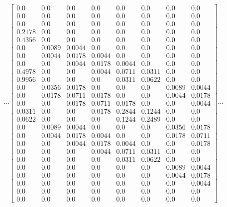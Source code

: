 \documentclass[12pt]{article}
\begin{document}
\[ \cdots \left[\begin{matrix}0.0 & 0.0 & 0.0 & 0.0 & 0.0 & 0.0 & 0.0 & 0.0\\0.0 & 0.0 & 0.0 & 0.0 & 0.0 & 0.0 & 0.0 & 0.0\\0.0 & 0.0 & 0.0 & 0.0 & 0.0 & 0.0 & 0.0 & 0.0\\0.2178 & 0.0 & 0.0 & 0.0 & 0.0 & 0.0 & 0.0 & 0.0\\0.4356 & 0.0 & 0.0 & 0.0 & 0.0 & 0.0 & 0.0 & 0.0\\0.0 & 0.0089 & 0.0044 & 0.0 & 0.0 & 0.0 & 0.0 & 0.0\\0.0 & 0.0044 & 0.0178 & 0.0044 & 0.0 & 0.0 & 0.0 & 0.0\\0.0 & 0.0 & 0.0044 & 0.0178 & 0.0044 & 0.0 & 0.0 & 0.0\\0.4978 & 0.0 & 0.0 & 0.0044 & 0.0711 & 0.0311 & 0.0 & 0.0\\0.9956 & 0.0 & 0.0 & 0.0 & 0.0311 & 0.0622 & 0.0 & 0.0\\0.0 & 0.0356 & 0.0178 & 0.0 & 0.0 & 0.0 & 0.0089 & 0.0044\\0.0 & 0.0178 & 0.0711 & 0.0178 & 0.0 & 0.0 & 0.0044 & 0.0178\\0.0 & 0.0 & 0.0178 & 0.0711 & 0.0178 & 0.0 & 0.0 & 0.0044\\0.0311 & 0.0 & 0.0 & 0.0178 & 0.2844 & 0.1244 & 0.0 & 0.0\\0.0622 & 0.0 & 0.0 & 0.0 & 0.1244 & 0.2489 & 0.0 & 0.0\\0.0 & 0.0089 & 0.0044 & 0.0 & 0.0 & 0.0 & 0.0356 & 0.0178\\0.0 & 0.0044 & 0.0178 & 0.0044 & 0.0 & 0.0 & 0.0178 & 0.0711\\0.0 & 0.0 & 0.0044 & 0.0178 & 0.0044 & 0.0 & 0.0 & 0.0178\\0.0 & 0.0 & 0.0 & 0.0044 & 0.0711 & 0.0311 & 0.0 & 0.0\\0.0 & 0.0 & 0.0 & 0.0 & 0.0311 & 0.0622 & 0.0 & 0.0\\0.0 & 0.0 & 0.0 & 0.0 & 0.0 & 0.0 & 0.0089 & 0.0044\\0.0 & 0.0 & 0.0 & 0.0 & 0.0 & 0.0 & 0.0044 & 0.0178\\0.0 & 0.0 & 0.0 & 0.0 & 0.0 & 0.0 & 0.0 & 0.0044\\0.0 & 0.0 & 0.0 & 0.0 & 0.0 & 0.0 & 0.0 & 0.0\\0.0 & 0.0 & 0.0 & 0.0 & 0.0 & 0.0 & 0.0 & 0.0\end{matrix}\right]\cdots\]
\end{document}
